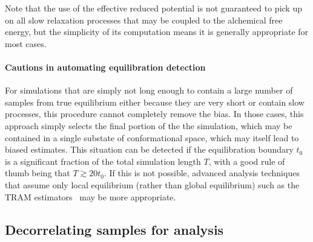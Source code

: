 \documentclass[9pt,bestpractices]{livecoms}
\begin{document}
Note that the use of the effective reduced potential is not guaranteed to pick up on all slow relaxation processes that may be coupled to the alchemical free energy, but the simplicity of its computation means it is generally appropriate for most cases.

\paragraph{Cautions in automating equilibration detection}
For simulations that are simply not long enough to contain a large number of samples from true equilibrium either because they are very short or contain slow processes, this procedure cannot completely remove the bias.
In those cases, this approach simply selects the final portion of the the simulation, which may be contained in a single substate of conformational space, which may itself lead to biased estimates. 
This situation can be detected if the equilibration boundary $t_0$ is a significant fraction of the total simulation length $T$, with a good rule of thumb being that $T \gtrsim 20 t_0$.
If this is not possible, advanced analysis techniques that assume only local equilibrium (rather than global equilibrium) such as the TRAM estimators~\cite{mey2014xtram,wu2016multiensemble,nuske2017markov} may be more appropriate.

\subsection*{Decorrelating samples for analysis}
\label{sec:decorrelating-samples}
\end{document}
